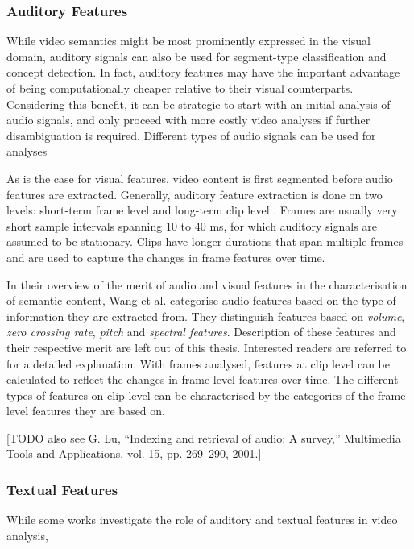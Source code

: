 \subsubsection{Auditory Features}

While video semantics might be most prominently expressed in the visual domain, auditory signals can also be used for segment-type classification and concept detection. In fact, auditory features may have the important advantage of being computationally cheaper relative to their visual counterparts. Considering this benefit, it can be strategic to start with an initial analysis of audio signals, and only proceed with more costly video analyses if further disambiguation is required. Different types of audio signals can be used for analyses 

As is the case for visual features, video content is first segmented before audio features are extracted. Generally, auditory feature extraction is done on two levels: short-term frame level and long-term clip level \cite{Wang:2000vf}. Frames are usually very short sample intervals spanning 10 to 40 ms, for which auditory signals are assumed to be stationary. Clips have longer durations that span multiple frames and are used to capture the changes in frame features over time.

In their overview of the merit of audio and visual features in the characterisation of semantic content, Wang et al. categorise audio features based on the type of information they are extracted from. They distinguish features based on \emph{volume}, \emph{zero crossing rate}, \emph{pitch} and \emph{spectral features}. Description of these features and their respective merit are left out of this thesis. Interested readers are referred to \cite{Wang:2000vf} for a detailed explanation. With frames analysed, features at clip level can be calculated to reflect the changes in frame level features over time. The different types of features on clip level can be characterised by the categories of the frame level features they are based on.

[TODO also see G. Lu, “Indexing and retrieval of audio: A survey,” Multimedia Tools and Applications, vol. 15, pp. 269–290, 2001.]

\subsubsection{Textual Features}

While some works investigate the role of auditory\cite{Wang:2000vf} and textual features\cite{Kuwano:2000wy} in video analysis, 


